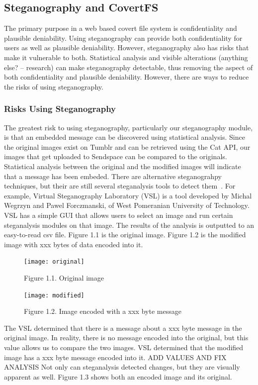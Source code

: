 \subsection{Steganography and CovertFS}
The primary purpose in a web based covert file system is confidentiality and plausible deniability. Using steganography can provide both confidentiality for users as well as plausible deniability. However, steganography also has risks that make it vulnerable to both. Statistical analysis and visible alterations (anything else? -- research) can make steganography detectable, thus removing the aspect of both confidentiality and plausible deniability. However, there are ways to reduce the risks of using steganography. 

\subsubsection{Risks Using Steganography}

The greatest risk to using steganography, particularly our steganography module, is that an embedded message can be discovered using statistical analysis. Since the original images exist on Tumblr and can be retrieved using the Cat API, our images that get uploaded to Sendspace can be compared to the originals. Statistical analysis between the original and the modified images will indicate that a message has been embeded. There are alternative steganograhpy techniques, but their are still several steganalysis tools to detect them~\cite{Laden}. For example, Virtual Steganography Laboratory (VSL) is a tool developed by Michal Wegrzyn and Pawel Forczmanski, of West Pomeranian University of Technology. VSL has a simple GUI that allows users to select an image and run certain steganalysis modules on that image. The results of the analysis is outputted to an easy-to-read csv file. Figure 1.1 is the original image. Figure 1.2 is the modified image with xxx bytes of data encoded into it. 
\begin{figure}[h]
	\texttt{[image: original]}
	\caption{Figure 1.1. Original image}
\end{figure}
\begin{figure}[h]
	\texttt{[image: modified]}
	\caption{Figure 1.2. Image encoded with a xxx byte message}
\end{figure}
The VSL determined that there is a message about a xxx byte message in the original image. In reality, there is no message encoded into the original, but this value allows us to compare the two images. VSL determined that the modified image has a xxx byte message encoded into it. ADD VALUES AND FIX ANALYSIS Not only can steganalysis detected changes, but they are visually apparent as well. Figure 1.3 shows both an encoded image and its original.

